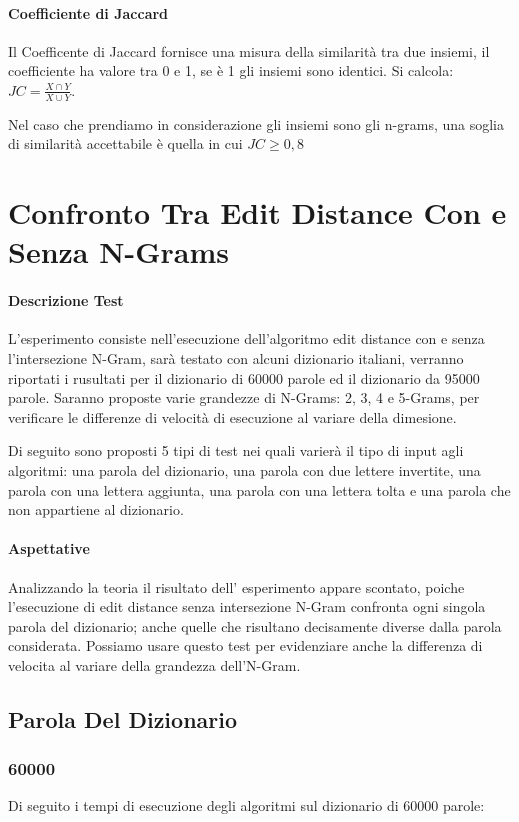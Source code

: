 \documentclass{article}
\begin{document}
\paragraph{Coefficiente di Jaccard} Il Coefficente di Jaccard fornisce una misura della similarità tra due insiemi, il coefficiente ha valore tra 0 e 1, se è 1 gli insiemi sono identici.
Si calcola:  $JC=\frac{X\cap Y}{X\cup Y}$.

Nel caso che prendiamo in considerazione gli insiemi sono gli n-grams, una soglia di similarità accettabile è quella in cui $JC \geq 0,8$

\section{Confronto Tra Edit Distance Con e Senza N-Grams}
\paragraph{Descrizione Test}
L'esperimento consiste nell'esecuzione dell'algoritmo edit distance con e senza l'intersezione N-Gram, sarà testato con alcuni dizionario italiani, verranno riportati i rusultati per il dizionario di 60000 parole ed il dizionario da 95000 parole. Saranno proposte varie grandezze di N-Grams: 2, 3, 4 e 5-Grams, per verificare le differenze di velocità di esecuzione al variare della dimesione.

Di seguito sono proposti 5 tipi di test nei quali varierà il tipo di input agli algoritmi: una parola del dizionario, una parola con due lettere invertite, una parola con una lettera aggiunta, una parola con una lettera tolta e una parola che non appartiene al dizionario.
\paragraph{Aspettative}
Analizzando la teoria il risultato dell'
esperimento appare scontato, poiche l'esecuzione di edit distance senza intersezione N-Gram confronta ogni singola parola del dizionario; anche quelle che risultano decisamente diverse dalla parola considerata. Possiamo usare questo test per evidenziare anche la differenza di velocita al variare della grandezza dell'N-Gram.
\subsection{Parola Del Dizionario}
\subsubsection{60000}
Di seguito i tempi di esecuzione degli algoritmi sul dizionario di 60000 parole:
\medskip
\end{document}
